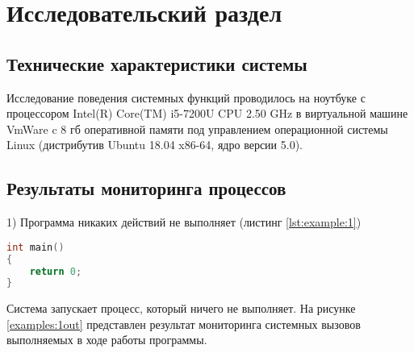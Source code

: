 \chapter{Исследовательский раздел}
\section{Технические характеристики системы}
Исследование поведения системных функций проводилось
на ноутбуке с процессором Intel(R) Core(TM) i5-7200U CPU 2.50 GHz
в виртуальной машине VmWare c 8 гб оперативной памяти под управлением 
операционной системы Linux (дистрибутив Ubuntu 18.04 x86-64, ядро версии 5.0).

\section{Результаты мониторинга процессов}
    1) Программа никаких действий не выполняет (листинг \ref{lst:example:1})
        \begin{lstlisting}[language=C, label=lst:example:1, caption=Программа не выполняющая никаких действий]
int main()
{
    return 0;
}
        \end{lstlisting}

        Система запускает процесс, который ничего не выполняет.
        На рисунке \ref{examples:1out} представлен результат мониторинга системных вызовов
        выполняемых в ходе работы программы.
        

